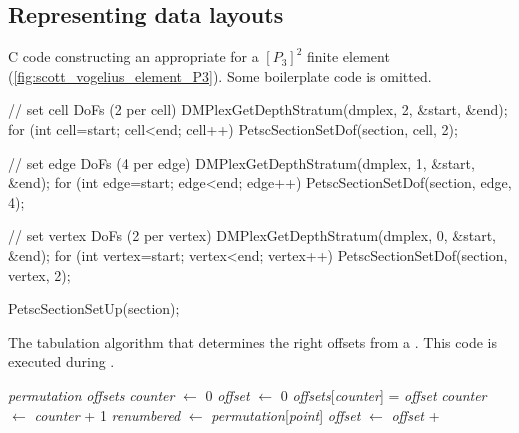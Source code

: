 \documentclass[thesis]{subfiles}
\begin{document}
\subsection{Representing data layouts}
\label{sec:dmplex_data_layout}

\begin{listing}
  \centering

  \caption{
    C code constructing an appropriate  for a $[P_3]^2$ finite element (\cref{fig:scott_vogelius_element_P3}).
    Some boilerplate code is omitted.
  }

  \begin{minipage}{.9\textwidth}
    \begin{calgorithm}
      // set cell DoFs (2 per cell)
      DMPlexGetDepthStratum(dmplex, 2, &start, &end);
      for (int cell=start; cell<end; cell++)
        PetscSectionSetDof(section, cell, 2);

      // set edge DoFs (4 per edge)
      DMPlexGetDepthStratum(dmplex, 1, &start, &end);
      for (int edge=start; edge<end; edge++)
        PetscSectionSetDof(section, edge, 4);

      // set vertex DoFs (2 per vertex)
      DMPlexGetDepthStratum(dmplex, 0, &start, &end);
      for (int vertex=start; vertex<end; vertex++)
        PetscSectionSetDof(section, vertex, 2);

      PetscSectionSetUp(section);
    \end{calgorithm}
  \end{minipage}

  \label{listing:section_p3}
\end{listing}

\begin{algorithm}
  \caption{
    The tabulation algorithm that determines the right offsets from a .
    This code is executed during .
  }

  \begin{algorithmic}[1]
    \Require \textit{permutation} 
    \Require \textit{offsets} 
    \State \textit{counter} $\gets$ 0
    \State \textit{offset} $\gets$ 0
      \State \textit{offsets}[\textit{counter}] = \textit{offset} 
      \State \textit{counter} $\gets$ \textit{counter} + 1
      \State \textit{renumbered} $\gets$ \textit{permutation}[\textit{point}]
      \State \textit{offset} $\gets$ \textit{offset} + 
    \EndFor
  \end{algorithmic}

  \label{alg:petsc_section_tabulate}
\end{algorithm}
\end{document}
